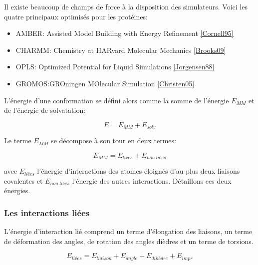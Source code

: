 Il existe beaucoup de champs de force à la disposition des simulateurs. Voici les quatre principaux optimisés pour les protéines:

\begin{itemize}
\item AMBER: Assisted Model Building with Energy Refinement \ref{Cornell95}
\item CHARMM: Chemistry at HARvard Molecular Mechanics \ref{Brooks09}
\item OPLS: Optimized Potential for Liquid Simulations \ref{Jorgensen88}
\item GROMOS:GROningen MOlecular Simulation \ref{Christen05}
\end{itemize}

L'énergie d'une conformation se défini alors comme la somme de l'énergie $E_{MM}$  et de l'énergie de solvatation:

\begin{equation}
  E = E_{MM} + E_{solv}
\end{equation}

Le terme $E_{MM}$ se décompose à son tour en deux termes:

\begin{equation}
  E_{MM} = E_{liées} + E_{non\ liées}
\end{equation}

avec $E_{liées}$ l'énergie d'interactions des atomes éloignés d'au plus deux liaisons covalentes et $E_{non\ liées}$  l'énergie des autres interactions. Détaillons ces deux énergies.

\subsubsection{Les interactions liées }

L'énergie d'interaction lié comprend un terme d'élongation des liaisons, un terme de déformation des angles, de rotation des angles dièdres et un terme de torsions.


\begin{equation}
  E_{liées} = E_{liaison} + E_{angle} +E_{dihèdre} + E_{impr}
\end{equation}


